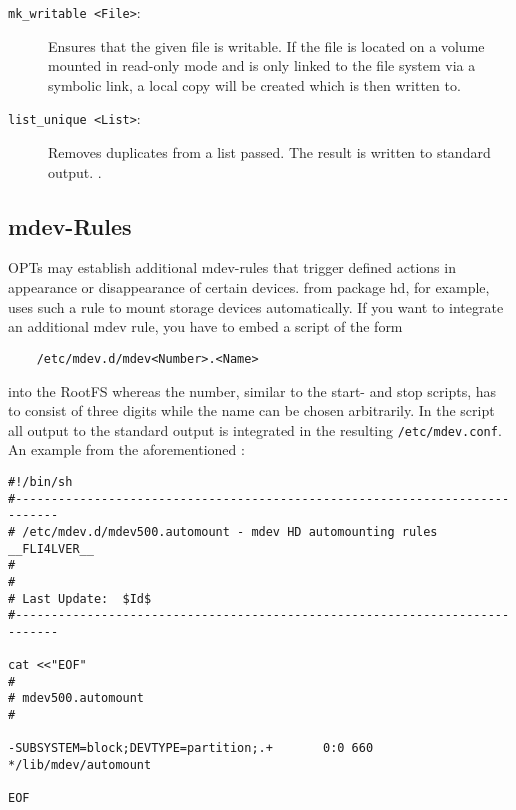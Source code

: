 \begin{description}

\item[\texttt{mk\_writable <File>}:]
Ensures that the given file is writable. If the file is located on a volume
mounted in read-only mode and is only linked to the file system via a
symbolic link, a local copy will be created which is then written to.

\item[\texttt{list\_unique <List>}:]
Removes duplicates from a list passed. The result is written to standard output.
.

\end{description}

\subsection{mdev-Rules}

OPTs may establish additional mdev-rules that trigger defined actions in
appearance or disappearance of certain devices.  from
package hd, for example, uses such a rule to mount storage devices automatically.
If you want to integrate an additional mdev rule, you have to embed a script of
the form

\begin{verbatim}
    /etc/mdev.d/mdev<Number>.<Name>
\end{verbatim}

into the RootFS whereas the number, similar to the start- and stop scripts, has
to consist of three digits while the name can be chosen arbitrarily. In the script
all output to the standard output is integrated in the resulting \texttt{/etc/mdev.conf}.
An example from the aforementioned :

\begin{small}
\begin{verbatim}
#!/bin/sh
#----------------------------------------------------------------------------
# /etc/mdev.d/mdev500.automount - mdev HD automounting rules     __FLI4LVER__
#
#
# Last Update:  $Id$
#----------------------------------------------------------------------------

cat <<"EOF"
#
# mdev500.automount
#

-SUBSYSTEM=block;DEVTYPE=partition;.+       0:0 660 */lib/mdev/automount

EOF
\end{verbatim}
\end{small}

